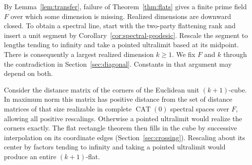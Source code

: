By Lemma~\ref{lem:transfer}, failure of Theorem~\ref{thm:flats} gives a
finite prime field $F$ over which some dimension is missing. Realized
dimensions are downward closed. To obtain a spectral line, start with
the two-party flattening rank and insert a unit segment by
Corollary~\ref{cor:spectral-geodesic}. Rescale the segment to lengths
tending to infinity and take a pointed ultralimit based at its midpoint.
There is consequently a largest realized dimension $k\ge1$. We fix
$F$ and $k$ through the contradiction in Section~\ref{sec:diagonal}.
Constants in that argument may depend on both.

Consider the distance matrix of the corners of the Euclidean unit
$(k+1)$-cube. In maximum norm this matrix has positive distance from
the set of distance matrices of that size realizable in complete
$\operatorname{CAT}(0)$ spectral spaces over $F$, allowing all positive
rescalings. Otherwise
a pointed ultralimit would realize the corners exactly. The flat
rectangle theorem then fills in the cube by successive interpolation
on its coordinate edges (Section~\ref{sec:crossing}). Rescaling about
its center by factors tending to infinity and taking a pointed ultralimit
would produce an entire $(k+1)$-flat.
